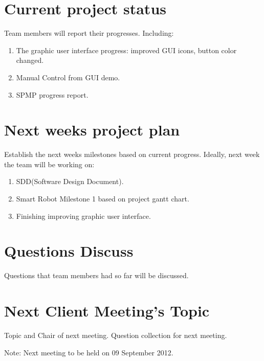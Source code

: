 \documentclass[11pt, a4paper]{article}
\begin{document}
\section{Current project status}
Team members will report their progresses. Including:
\begin{enumerate}
	\item  The graphic user interface progress: improved GUI icons, button color changed.
	\item  Manual Control from GUI demo.
	\item  SPMP progress report.
\end{enumerate}


\section{Next weeks project plan}
Establish the next weeks milestones based on current progress. Ideally, next week the team will be working on:  
\begin{enumerate}
	\item SDD(Software Design Document).
	\item Smart Robot Milestone 1 based on project gantt chart. 
	\item Finishing improving graphic user interface.
\end{enumerate}

\section{Questions Discuss}
Questions that team members had so far will be discussed.

\section{Next Client Meeting's Topic}
Topic and Chair of next meeting. Question collection for next meeting. 

\vspace*{10pt}
\noindent Note: Next meeting to be held on 09 September 2012.
\end{document}
